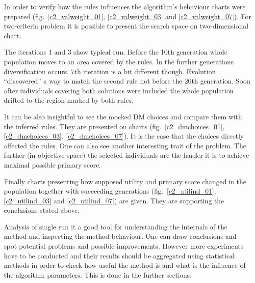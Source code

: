 In order to verify how the rules influences the algorithm's behaviour charts
were prepared (fig.~\ref{c2_valweight_01}, \ref{c2_valweight_03} and
\ref{c2_valweight_07}). For two-criteria problem it is possible to present the
search space on two-dimensional chart.

The iterations $1$ and $3$ show typical run. Before the 10th generation whole
population moves to an area covered by the rules. In the further generations
diversification occurs. 7th iteration is a bit different though. Evolution
``discovered'' a way to match the second rule not before the 20th
generation. Soon after individuals covering both solutions were included the
whole population drifted to the region marked by both rules.

It can be also insightful to see the mocked DM choices and compare them with
the inferred rules. They are presented on charts (fig.~\ref{c2_dmchoices_01},
\ref{c2_dmchoices_03}, \ref{c2_dmchoices_07}). It is the case that the choices
directly affected the rules. One can also see another interesting trait of the
problem. The further (in objective space) the selected individuals are the
harder it is to achieve maximal possible primary score.

Finally charts presenting how supposed utility and primary score changed in
the population together with succeeding generations (fig.~\ref{c2_utilind_01},
\ref{c2_utilind_03} and \ref{c2_utilind_07}) are given. They are supporting
the conclusions stated above.

Analysis of single run it a good tool for understanding the internals of the
method and inspecting the method behaviour. One can draw conclusions and spot
potential problems and possible improvements. However more experiments have to
be conducted and their results should be aggregated using statistical methods
in order to check how useful the method is and what is the influence of the
algorithm parameters. This is done in the further sections.

